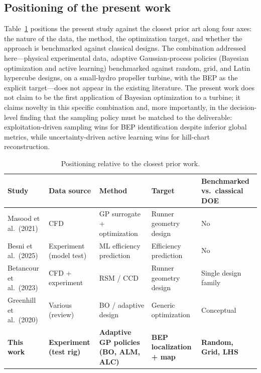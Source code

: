\documentclass[preprint,12pt]{elsarticle}
\begin{document}
\subsection{Positioning of the present work}
Table~\ref{tab:positioning} positions the present study against the closest prior art
along four axes: the nature of the data, the method, the optimization target, and
whether the approach is benchmarked against classical designs. The combination
addressed here---physical experimental data, adaptive Gaussian-process policies
(Bayesian optimization and active learning) benchmarked against random, grid, and
Latin hypercube designs, on a small-hydro propeller turbine, with the BEP as the
explicit target---does not appear in the existing literature. The present work does
not claim to be the first application of Bayesian optimization to a turbine; it claims
novelty in this specific combination and, more importantly, in the decision-level
finding that the sampling policy must be matched to the deliverable:
exploitation-driven sampling wins for BEP identification despite inferior global
metrics, while uncertainty-driven active learning wins for hill-chart reconstruction.

\begin{table}[t]
\centering
\caption{Positioning relative to the closest prior work.}
\label{tab:positioning}
\small
\begin{tabular}{@{}p{2.4cm}p{2.3cm}p{2.6cm}p{2.4cm}p{2.0cm}@{}}
\toprule
Study & Data source & Method & Target & Benchmarked vs.\ classical DOE \\
\midrule
Masood et al.\ (2021) & CFD & GP surrogate + optimization & Runner geometry design & No \\
Besni et al.\ (2025) & Experiment (model test) & ML efficiency prediction & Efficiency prediction & No \\
Betancour et al.\ (2023) & CFD + experiment & RSM / CCD & Runner geometry design & Single design family \\
Greenhill et al.\ (2020) & Various (review) & BO / adaptive design & Generic optimization & Conceptual \\
\textbf{This work} & \textbf{Experiment (test rig)} & \textbf{Adaptive GP policies (BO, ALM, ALC)} & \textbf{BEP localization + map} & \textbf{Random, Grid, LHS} \\
\bottomrule
\end{tabular}
\end{table}

\end{document}
